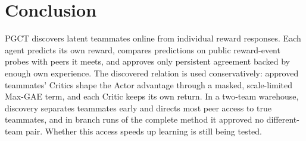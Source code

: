 \documentclass{article}
\begin{document}
\section{Conclusion}
PGCT discovers latent teammates online from individual reward responses. Each agent predicts its own reward, compares predictions on public reward-event probes with peers it meets, and approves only persistent agreement backed by enough own experience. The discovered relation is used conservatively: approved teammates' Critics shape the Actor advantage through a masked, scale-limited Max-GAE term, and each Critic keeps its own return. In a two-team warehouse, discovery separates teammates early and directs most peer access to true teammates, and in branch runs of the complete method it approved no different-team pair. Whether this access speeds up learning is still being tested.



\end{document}
